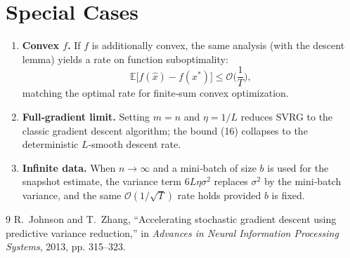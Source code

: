\documentclass{article}
\begin{document}
\section*{Special Cases}
\begin{enumerate}[label=(\alph*)]
\item \textbf{Convex $f$.} If $f$ is additionally convex, the same analysis (with the descent lemma) yields a rate on function suboptimality:
\[
\mathbb{E}\!\big[f(\hat{x})-f(x^{*})\big]\le \mathcal{O}\!\Big(\frac{1}{T}\Big),
\]
matching the optimal rate for finite‑sum convex optimization.
\item \textbf{Full‑gradient limit.} Setting $m=n$ and $\eta=1/L$ reduces SVRG to the classic gradient descent algorithm; the bound (16) collapses to the deterministic $L$‑smooth descent rate.
\item \textbf{Infinite data.} When $n\to\infty$ and a mini‑batch of size $b$ is used for the snapshot estimate, the variance term $6L\eta\sigma^{2}$ replaces $\sigma^{2}$ by the mini‑batch variance, and the same $\mathcal{O}(1/\sqrt{T})$ rate holds provided $b$ is fixed.
\end{enumerate}

\begin{thebibliography}{9}
R.~Johnson and T.~Zhang, ``Accelerating stochastic gradient descent using
  predictive variance reduction,'' in \emph{Advances in Neural Information
  Processing Systems}, 2013, pp. 315--323.
\end{thebibliography}
\end{document}

